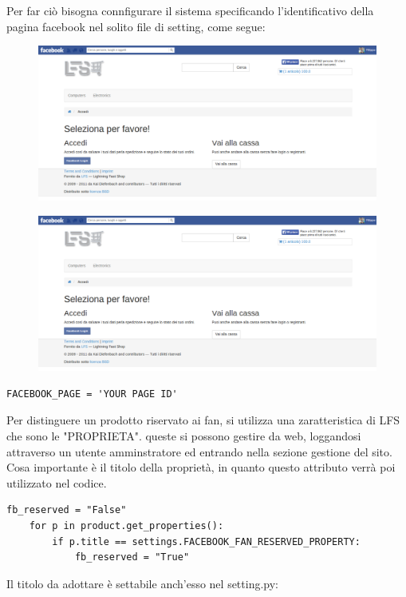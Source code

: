 Per far ciò bisogna connfigurare il sistema specificando l'identificativo della pagina facebook nel solito file di setting, come segue:

\begin{figure}
\includegraphics[width=0.9\columnwidth]{img/checkout}
\end{figure}

\begin{figure}
\includegraphics[width=0.9\columnwidth]{img/checkout}
\end{figure}

\begin{lstlisting}
FACEBOOK_PAGE = 'YOUR PAGE ID'
\end{lstlisting}

Per distinguere un prodotto riservato ai fan, si utilizza una zaratteristica di LFS che sono le "PROPRIETA". queste si possono gestire da web, loggandosi attraverso un utente amminstratore ed entrando nella sezione gestione del sito. Cosa importante è il titolo della proprietà, in quanto questo attributo verrà poi utilizzato nel codice.
 
\begin{lstlisting}
fb_reserved = "False"
    for p in product.get_properties():
        if p.title == settings.FACEBOOK_FAN_RESERVED_PROPERTY:
            fb_reserved = "True"
\end{lstlisting}

Il titolo da adottare è settabile anch'esso nel setting.py:


